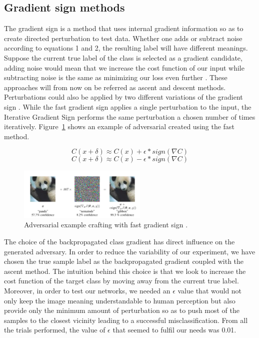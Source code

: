 \documentclass[runningheads,a4paper]{llncs}
\begin{document}
\subsection{Gradient sign methods}

The gradient sign is a method that uses internal gradient information so as to create directed perturbation to test data. Whether one adds or subtract noise according to equations 1 and 2, the resulting label will have different meanings. Suppose the current true label of the class is selected as a gradient candidate, adding noise would mean that we increase the cost function of our input while subtracting noise is the same as minimizing our loss even further \cite{goodfellow2016_book}. These approaches will from now on be referred as ascent and descent methods. Perturbations could also be applied by two different variations of the gradient sign \cite{goodfellow2014}. While the fast gradient sign applies a single perturbation to the input, the Iterative Gradient Sign performs the same perturbation a chosen number of times iteratively. Figure~\ref{fig:fgsm_craft} shows an example of adversarial created using the fast method.


\begin{equation}
C(x + \delta)\approx C(x) + \epsilon * sign(\nabla C)
\end{equation}
\begin{equation}
C(x + \delta)\approx C(x) - \epsilon * sign(\nabla C)
\end{equation}
\begin{figure}
	\centering
	\includegraphics[height=2.5cm]{panda.png}
	\caption{Adversarial example crafting with fast gradient sign \cite{goodfellow2014}.}
	\label{fig:fgsm_craft}
\end{figure}

The choice of the backpropagated class gradient has direct influence on the generated adversary. In order to reduce the variability of our experiment, we have chosen the true sample label as the backpropagated gradient coupled with the ascent method. The intuition behind this choice is that we look to increase the cost function of the target class by moving away from the current true label. Moreover, in order to test our networks, we needed an $\epsilon$ value that would not only keep the image meaning understandable to human perception but also provide only the minimum amount of perturbation so as to push most of the samples to the closest vicinity leading to a successful misclassification. From all the trials performed, the value of $\epsilon$ that seemed to fulfil our needs was 0.01. 
\end{document}
